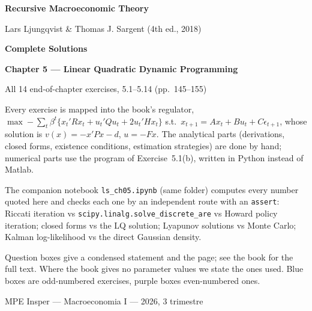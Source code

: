 \documentclass[12pt, letterpaper]{article}
\begin{document}
\begin{titlepage}
\centering
\vspace*{2.5cm}
{\Huge\bfseries\color{darkblue} Recursive Macroeconomic Theory\par}
\vspace{6pt}
{\large Lars Ljungqvist \& Thomas J. Sargent (4th ed., 2018)\par}
\vspace{1.4cm}
{\LARGE\bfseries Complete Solutions\par}
\vspace{6pt}
{\LARGE\bfseries Chapter 5 --- Linear Quadratic Dynamic Programming\par}
\vspace{1.2cm}
{\large All 14 end-of-chapter exercises, 5.1--5.14 (pp.~145--155)\par}
\vspace{2cm}

\begin{tcolorbox}[theorybox,title={What is in this file},width=0.86\textwidth]
\small
Every exercise is mapped into the book's regulator,
$\max -\sum_t\beta^t\{x_t'Rx_t+u_t'Qu_t+2u_t'Hx_t\}$ s.t.\ $x_{t+1}=Ax_t+Bu_t+C\epsilon_{t+1}$,
whose solution is $v(x)=-x'Px-d$, $u=-Fx$. The analytical parts (derivations, closed forms,
existence conditions, estimation strategies) are done by hand; numerical parts use the program of
Exercise~5.1(b), written in Python instead of Matlab.

\smallskip
The companion notebook \texttt{ls\_ch05.ipynb} (same folder) computes every number quoted here and
checks each one by an independent route with an \texttt{assert}: Riccati iteration vs
\texttt{scipy.linalg.solve\_discrete\_are} vs Howard policy iteration; closed forms vs the LQ
solution; Lyapunov solutions vs Monte Carlo; Kalman log-likelihood vs the direct Gaussian density.

\smallskip
Question boxes give a condensed statement and the page; see the book for the full text. Where the
book gives no parameter values we state the ones used. Blue boxes are odd-numbered exercises,
purple boxes even-numbered ones.
\end{tcolorbox}

\vfill
{\small MPE Insper --- Macroeconomia I --- 2026, 3\textordmasculine{} trimestre\par}
\end{titlepage}
\end{document}
